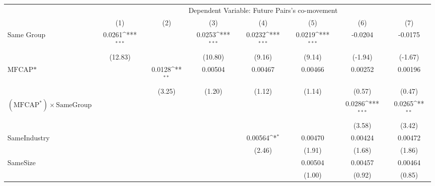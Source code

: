 {
\def\sym#1{\ifmmode^{#1}\else\(^{#1}\)\fi}
\begin{tabular}{l*{7}{c}}
\hline\hline
                &\multicolumn{7}{c}{Dependent Variable: Future Pairs's co-movement}                                                                  \\\cmidrule(lr){2-8}
                &\multicolumn{1}{c}{(1)}         &\multicolumn{1}{c}{(2)}         &\multicolumn{1}{c}{(3)}         &\multicolumn{1}{c}{(4)}         &\multicolumn{1}{c}{(5)}         &\multicolumn{1}{c}{(6)}         &\multicolumn{1}{c}{(7)}         \\
\hline
Same Group      &   0.0261\sym{***}&                  &   0.0253\sym{***}&   0.0232\sym{***}&   0.0219\sym{***}&  -0.0204         &  -0.0175         \\
                &  (12.83)         &                  &  (10.80)         &   (9.16)         &   (9.14)         &  (-1.94)         &  (-1.67)         \\
[1em]
$ \text{MFCAP*} $&                  &   0.0128\sym{**} &  0.00504         &  0.00467         &  0.00466         &  0.00252         &  0.00196         \\
                &                  &   (3.25)         &   (1.20)         &   (1.12)         &   (1.14)         &   (0.57)         &   (0.47)         \\
[1em]
 $ (\text{MFCAP}^*) \times {\text{SameGroup} }  $ &                  &                  &                  &                  &                  &   0.0286\sym{***}&   0.0265\sym{**} \\
                &                  &                  &                  &                  &                  &   (3.58)         &   (3.42)         \\
[1em]
SameIndustry    &                  &                  &                  &  0.00564\sym{*}  &  0.00470         &  0.00424         &  0.00472         \\
                &                  &                  &                  &   (2.46)         &   (1.91)         &   (1.68)         &   (1.86)         \\
[1em]
SameSize        &                  &                  &                  &                  &  0.00504         &  0.00457         &  0.00464         \\
                &                  &                  &                  &                  &   (1.00)         &   (0.92)         &   (0.85)         \\

\end{tabular}}
